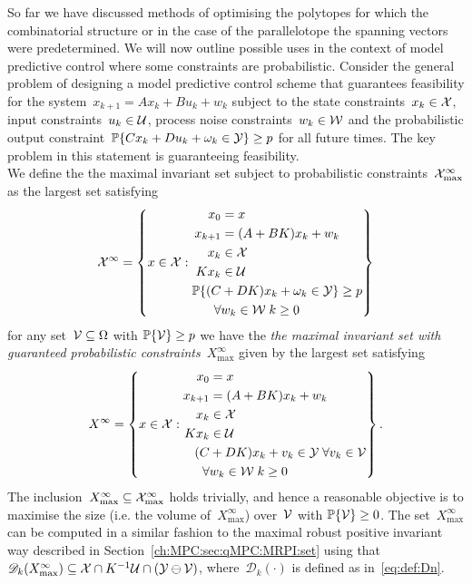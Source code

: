 %
\mysplit So far we have discussed methods of optimising the polytopes for which the combinatorial structure or in the case of the parallelotope the spanning vectors were predetermined.
%
We will now outline possible uses in the context of model predictive control where some constraints are probabilistic.
%
Consider the general problem of designing a model predictive control scheme that guarantees feasibility for the system~$x_{k+1}=Ax_k+Bu_k+w_k$ subject to the state constraints~$x_k\in\mathcal X$, input constraints~$u_k\in\mathcal U$, process noise constraints~$w_k\in\mathcal W$ and the probabilistic output constraint~$\mathbb P\{Cx_k+Du_k+\omega_k\in\mathcal Y\}\geq p$ for all future times.
%
The key problem in this statement is guaranteeing feasibility.
%
\\[1em]
%
We define the the maximal invariant set subject to probabilistic constraints~$\mathcal X^\infty_{\max}$ as the largest set satisfying
%
\begin{equation}
	\mathcal X^\infty = \left\{x\in\mathcal X:\begin{aligned}x_0&=x\\
										x_{k+1}&=(A+BK)x_k+w_k\\
										x_k&\in\mathcal X\\
										Kx_k&\in\mathcal U\\
										\mathbb P\{(C&+DK)x_k+\omega_k\in\mathcal Y\}\geq p\\
										\forall &w_k\in\mathcal W\; k\geq 0
	\end{aligned}\right\}
\end{equation}
%
for any set~$\mathcal V\subseteq\Omega$ with $\mathbb P\{\mathcal V\}\geq p$ we have the \emph{the maximal invariant set with guaranteed probabilistic constraints}~$X^\infty_{\max}$ given by the largest set satisfying
%
\begin{equation}
	X^\infty = \left\{x\in\mathcal X:\begin{aligned}x_0&=x\\
										x_{k+1}&=(A+BK)x_k+w_k\\
										x_k&\in\mathcal X\\
										Kx_k&\in\mathcal U\\
										(C&+DK)x_k+v_k\in\mathcal Y\;\forall v_k\in\mathcal V\\
										\forall &w_k\in\mathcal W\; k\geq 0
	\end{aligned}\right\}.
\end{equation}
%
The inclusion~$X^\infty_{\max}\subseteq\mathcal X^\infty_{\max}$ holds trivially, and hence a reasonable objective is to maximise the size (i.e. the volume of~$X^\infty_{\max}$) over~$\mathcal V$ with $\mathbb P\{\mathcal V\}\geq 0$.
%
The set~$X^\infty_{\max}$ can be computed in a similar fashion to the maximal robust positive invariant way described in Section~\ref{ch:MPC:sec:qMPC:MRPI:set} using that~$\mathscr D_k(X^\infty_{\max})\subseteq\mathcal X\cap K^{-1}\mathcal U\cap(\mathcal Y\ominus\mathcal V)$, where~$\mathscr D_k(\cdot)$ is defined as in~\eqref{eq:def:Dn}.
